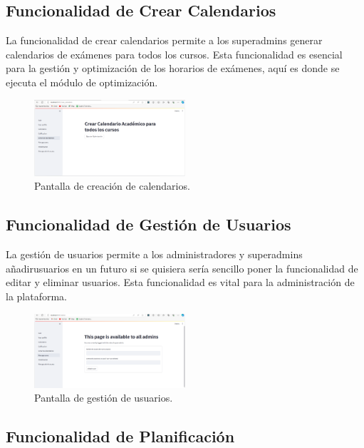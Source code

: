 \documentclass{article}
\begin{document}
\subsection{Funcionalidad de Crear Calendarios}

La funcionalidad de crear calendarios permite a los superadmins  generar calendarios de exámenes para todos los cursos. Esta funcionalidad es esencial para la gestión y optimización de los horarios de exámenes, aquí es donde se ejecuta el módulo de optimización.

\begin{figure}[H] \centering \includegraphics[width=0.5\textwidth]{crear_calendarios.png} \caption{Pantalla de creación de calendarios.} \end{figure}

\subsection{Funcionalidad de Gestión de Usuarios}

La gestión de usuarios permite a los administradores y superadmins añadirusuarios en un futuro si se quisiera sería sencillo poner la funcionalidad de  editar y eliminar usuarios. Esta funcionalidad es vital para la administración de la plataforma.

\begin{figure}[H] \centering \includegraphics[width=0.5\textwidth]{gestion_usuarios.png} \caption{Pantalla de gestión de usuarios.} \end{figure}

\subsection{Funcionalidad de Planificación}
\end{document}
